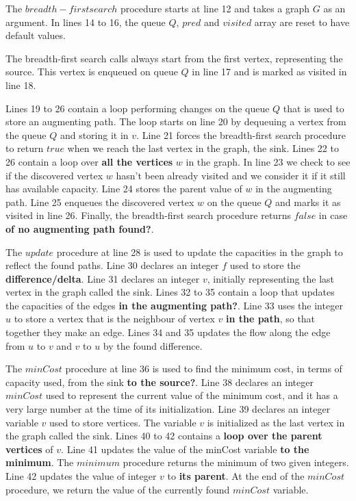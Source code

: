 \documentclass{l4proj}
\begin{document}
\noindent The $breadth-first search$ procedure starts at line 12 and takes a graph $G$ as an argument. In lines 14 to 16, the queue $Q$, $pred$ and $visited$ array are reset to have default values.

\noindent The breadth-first search calls always start from the first vertex, representing the source. This vertex is enqueued on queue $Q$ in line 17 and is marked as visited in line 18.

\noindent Lines 19 to 26 contain a loop performing changes on the queue $Q$ that is used to store an augmenting path. The loop starts on line 20 by dequeuing a vertex from the queue $Q$ and storing it in $v$. Line 21 forces the breadth-first search procedure to return $true$ when we reach the last vertex in the graph, the sink. Lines 22 to 26 contain a loop over \textbf{all the vertices} $w$ in the graph. In line 23 we check to see if the discovered vertex $w$ hasn't been already visited and we consider it if it still has available capacity. Line 24 stores the parent value of $w$ in the augmenting path. Line 25 enqueues the discovered vertex $w$ on the queue $Q$ and marks it as visited in line 26. Finally, the breadth-first search procedure returns $false$ in case \textbf{of no augmenting path found?}.

\noindent The $update$ procedure at line 28 is used to update the capacities in the graph to reflect the found paths. Line 30 declares an integer $f$ used to store the \textbf{difference/delta}. Line 31 declares an integer $v$, initially representing the last vertex in the graph called the sink. Lines 32 to 35 contain a loop that updates the capacities of the edges \textbf{in the augmenting path?}. Line 33 uses the integer $u$ to store a vertex that is the neighbour of vertex $v$ \textbf{in the path}, so that together they make an edge. Lines 34 and 35 updates the flow along the edge from $u$ to $v$ and $v$ to $u$ by the found difference.

\noindent The $minCost$ procedure at line 36 is used to find the minimum cost, in terms of capacity used, from the sink \textbf{to the source?}. Line 38 declares an integer $minCost$ used to represent the current value of the minimum cost, and it has a very large number at the time of its initialization. Line 39 declares an integer variable $v$ used to store vertices. The variable $v$ is initialized as the last vertex in the graph called the sink. Lines 40 to 42 contains a \textbf{loop over the parent vertices} of $v$. Line 41 updates the value of the minCost variable \textbf{to the minimum}. The $minimum$ procedure returns the minimum of two given integers. Line 42 updates the value of integer $v$ to \textbf{its parent}. At the end of the $minCost$ procedure, we return the value of the currently found $minCost$ variable.
\end{document}

